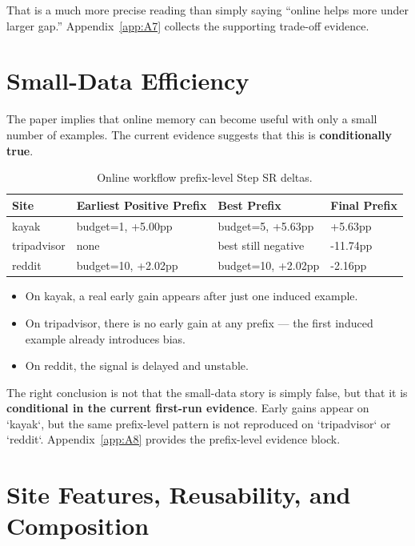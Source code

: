 \documentclass{article}
\providecommand{\tightlist}{%
  \setlength{\itemsep}{0pt}\setlength{\parskip}{0.8em}}
\begin{document}
That is a much more precise reading than simply saying ``online helps
more under larger gap.'' Appendix~\ref{app:A7} collects the supporting
trade-off evidence.

\section{Small-Data Efficiency}\label{small-data-efficiency}

The paper implies that online memory can become useful with only a small
number of examples. The current evidence suggests that this is
\textbf{conditionally true}.

{\begin{longtable}[]{@{}llll@{}}
\caption{Online workflow prefix-level Step SR deltas.}\label{tab:online-workflow-prefix-level-step-sr-deltas}\\

\toprule\noalign{}
Site & Earliest Positive Prefix & Best Prefix & Final Prefix \\
\midrule\noalign{}
\endhead
\bottomrule\noalign{}
\endlastfoot
kayak & budget=1, +5.00pp & budget=5, +5.63pp & +5.63pp \\
tripadvisor & none & best still negative & -11.74pp \\
reddit & budget=10, +2.02pp & budget=10, +2.02pp & -2.16pp \\
\end{longtable}
}

\begin{itemize}
\tightlist
\item
  On kayak, a real early gain appears after just one induced example.
\item
  On tripadvisor, there is no early gain at any prefix --- the first
  induced example already introduces bias.
\item
  On reddit, the signal is delayed and unstable.
\end{itemize}

The right conclusion is not that the small-data story is simply false,
but that it is \textbf{conditional in the current first-run evidence}.
Early gains appear on `kayak`, but the same prefix-level pattern is not
reproduced on `tripadvisor` or `reddit`. Appendix~\ref{app:A8}
provides the prefix-level evidence block.

\section{Site Features, Reusability, and
Composition}\label{site-features-reusability-and-composition}
\end{document}
